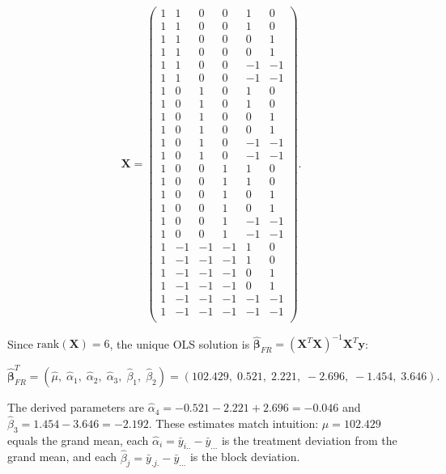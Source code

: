 \documentclass[letterpaper]{article}
\begin{document}
				\[
				\mathbf{X} =
				\begin{pmatrix}
					1 &  1 &  0 &  0 &  1 &  0 \\
					1 &  1 &  0 &  0 &  1 &  0 \\
					1 &  1 &  0 &  0 &  0 &  1 \\
					1 &  1 &  0 &  0 &  0 &  1 \\
					1 &  1 &  0 &  0 & -1 & -1 \\
					1 &  1 &  0 &  0 & -1 & -1 \\
					1 &  0 &  1 &  0 &  1 &  0 \\
					1 &  0 &  1 &  0 &  1 &  0 \\
					1 &  0 &  1 &  0 &  0 &  1 \\
					1 &  0 &  1 &  0 &  0 &  1 \\
					1 &  0 &  1 &  0 & -1 & -1 \\
					1 &  0 &  1 &  0 & -1 & -1 \\
					1 &  0 &  0 &  1 &  1 &  0 \\
					1 &  0 &  0 &  1 &  1 &  0 \\
					1 &  0 &  0 &  1 &  0 &  1 \\
					1 &  0 &  0 &  1 &  0 &  1 \\
					1 &  0 &  0 &  1 & -1 & -1 \\
					1 &  0 &  0 &  1 & -1 & -1 \\
					1 & -1 & -1 & -1 &  1 &  0 \\
					1 & -1 & -1 & -1 &  1 &  0 \\
					1 & -1 & -1 & -1 &  0 &  1 \\
					1 & -1 & -1 & -1 &  0 &  1 \\
					1 & -1 & -1 & -1 & -1 & -1 \\
					1 & -1 & -1 & -1 & -1 & -1 \\
				\end{pmatrix}.
				\]
				
				Since $\text{rank}(\mathbf{X})=6$, the unique OLS solution is
				$\hat{\boldsymbol{\beta}}_{FR} = (\mathbf{X}^T\mathbf{X})^{-1}\mathbf{X}^T\mathbf{y}$:
				
				\[
				\hat{\boldsymbol{\beta}}_{FR}^T
				= (\hat\mu,\;\hat\alpha_1,\;\hat\alpha_2,\;\hat\alpha_3,\;\hat\beta_1,\;\hat\beta_2)
				= (102.429,\;0.521,\;2.221,\;-2.696,\;-1.454,\;3.646).
				\]
				
				The derived parameters are
				$\hat\alpha_4 = -0.521-2.221+2.696 = -0.046$ and
				$\hat\beta_3 = 1.454-3.646 = -2.192$.
				These estimates match intuition: $\hat\mu = 102.429$ equals the grand
				mean, each $\hat\alpha_i = \bar{y}_{i..} - \bar{y}_{...}$ is the
				treatment deviation from the grand mean, and each $\hat\beta_j =
				\bar{y}_{.j.} - \bar{y}_{...}$ is the block deviation.
				
\end{document}
